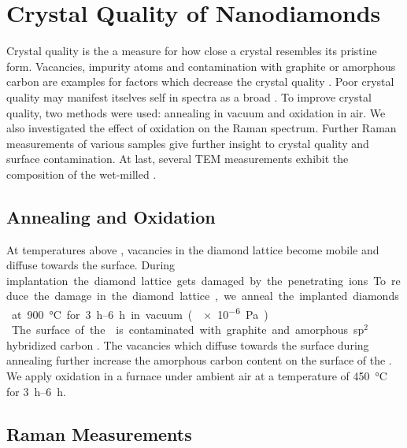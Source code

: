 
\chapter{Crystal Quality of Nanodiamonds}	\label{ch::crystal_quality}

Crystal quality is the a measure for how close a crystal resembles its pristine form\cite{}.
Vacancies, impurity atoms and contamination with graphite or amorphous carbon are examples for factors which decrease the crystal quality .
Poor crystal quality may manifest itselves self in \pl spectra as a broad \bkg.
To improve crystal quality, two methods were used: annealing in vacuum and oxidation in air.
We also investigated the effect of oxidation on the Raman spectrum.
Further Raman measurements of various samples give further insight to crystal quality and surface contamination.
At last, several TEM measurements exhibit the composition of the wet-milled \nds. 

	\section{Annealing and Oxidation}\label{sec::ann_ox}

	At temperatures above , vacancies in the diamond lattice become mobile and diffuse towards the surface\cite{}.
	During \si implantation the diamond lattice gets damaged by the penetrating ions.
	To reduce the damage in the diamond lattice, we anneal the implanted diamonds at \SI{900}{\celsius} for \SIrange{3}{6}{h} in vacuum (\SI{e-6}{Pa}).
	\\
	The surface of the \nds is contaminated with graphite and amorphous sp$^2$ hybridized carbon .
	The vacancies which diffuse towards the surface during annealing further increase the amorphous carbon content on the surface of the \nds \cite{}.
	We apply oxidation in a furnace under ambient air at a temperature of \SI{450}{\celsius} for \SIrange{3}{6}{h}.


	\section{Raman Measurements} \label{sec::raman}


